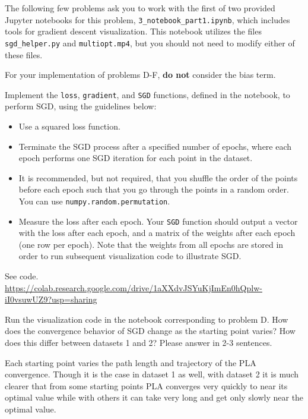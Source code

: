 The following few problems ask you to work with the first of two provided Jupyter notebooks for this problem, \texttt{3_notebook_part1.ipynb}, which includes tools for gradient descent visualization. This notebook utilizes the files \texttt{sgd_helper.py} and \texttt{multiopt.mp4}, but you should not need to modify either of these files. 

For your implementation of problems D-F, \textbf{do not} consider the bias term.

\begin{problem}[6]
  Implement the \texttt{loss}, \texttt{gradient}, and \texttt{SGD} functions, defined in the notebook, to perform SGD, using the guidelines below:

  \begin{itemize}
    \item Use a squared loss function.
    \item Terminate the SGD process after a specified number of epochs, where each epoch performs one SGD iteration for each point in the dataset.
    \item It is recommended, but not required, that you shuffle the order of the points before each epoch such that you go through the points in a random order. You can use \texttt{numpy.random.permutation}.
    \item Measure the loss after each epoch. Your \texttt{SGD} function should output a vector with the loss after each epoch, and a matrix of the weights after each epoch (one row per epoch). Note that the weights from all epochs are stored in order to run subsequent visualization code to illustrate SGD.
  \end{itemize}
\end{problem}
\begin{solution}
See code. 
\\ \url{https://colab.research.google.com/drive/1aXXdvJSYuKjImEn0hQplw-iI0vsuwUZ9?usp=sharing}  %
\end{solution}

\begin{problem}[2]
  Run the visualization code in the notebook corresponding to problem D. How does the convergence behavior of SGD change as the starting point varies? How does this differ between datasets 1 and 2? Please answer in 2-3 sentences.
\end{problem}
\begin{solution}
  Each starting point varies the path length and trajectory of the PLA convergence. Though it is the case in dataset 1 as well, with dataset 2 it is much clearer that from some starting points PLA converges very quickly to near its optimal value while with others it can take very long and get only slowly near the optimal value.
\end{solution}

